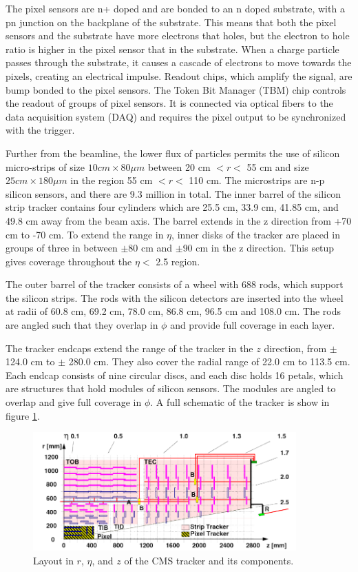 \documentclass[oneside, letterpaper, oldfontcommands]{memoir}
\begin{document}
\qquad The pixel sensors are n+ doped and are bonded to an n doped substrate, with a pn junction on the backplane of the substrate. This means that both the pixel sensors and the substrate have more electrons that holes, but the electron to hole ratio is higher in the pixel sensor that in the substrate. When a charge particle passes through the substrate, it causes a cascade of electrons to move towards the pixels, creating an electrical impulse. Readout chips, which amplify the signal, are bump bonded \cite{Chiochia:2007pu} to the pixel sensors. The Token Bit Manager (TBM) chip controls the readout of groups of pixel sensors. It is connected via optical fibers to the data acquisition system (DAQ) and requires the pixel output to be synchronized with the trigger.

\qquad Further from the beamline, the lower flux of particles permits the use of silicon micro-strips of size $10 cm \times 80 \mu m$ between 20 cm $< r < $ 55 cm and size $25 cm \times 180 \mu m$ in the region 55 cm $ < r < $ 110 cm. The microstrips are n-p silicon sensors, and there are 9.3 million in total. The inner barrel of the silicon strip tracker contains four cylinders which are 25.5 cm, 33.9 cm, 41.85 cm, and 49.8 cm away from the beam axis. The barrel extends in the z direction from +70 cm to -70 cm. To extend the range in $\eta$, inner disks of the tracker are placed in groups of three in between $\pm$80 cm and $\pm$90 cm in the z direction. This setup gives coverage throughout the $\eta<$  2.5 region.

\qquad The outer barrel of the tracker consists of a wheel with 688 rods, which support the silicon strips. The rods with the silicon detectors are inserted into the wheel at radii of 60.8 cm, 69.2 cm, 78.0 cm, 86.8 cm, 96.5 cm and 108.0 cm. The rods are angled such that they overlap in $\phi$ and provide full coverage in each layer.

\qquad The tracker endcaps extend the range of the tracker in the $z$ direction, from $\pm$ 124.0 cm to $\pm$ 280.0 cm. They also cover the radial range of 22.0 cm to 113.5 cm. Each endcap consists of nine circular discs, and each disc holds 16 petals, which are structures that hold modules of silicon sensors. The modules are angled to overlap and give full coverage in $\phi$. A full schematic of the tracker is show in figure \ref{fig:cmstracker}.

\begin{figure}[here]
\includegraphics[width=0.9\textwidth]{cmstracker.png}
\caption{Layout in $r$, $\eta$, and $z$ of the CMS tracker and its components.  \cite{Chatrchyan:2014wfa}}
\label{fig:cmstracker}
\end{figure}
\end{document}
